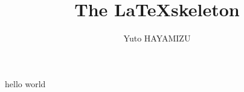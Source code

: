 \documentclass[a4j]{jsarticle}
\title{The \LaTeX skeleton}
\author{Yuto HAYAMIZU}
\begin{document}
\maketitle

hello world
\end{document}
